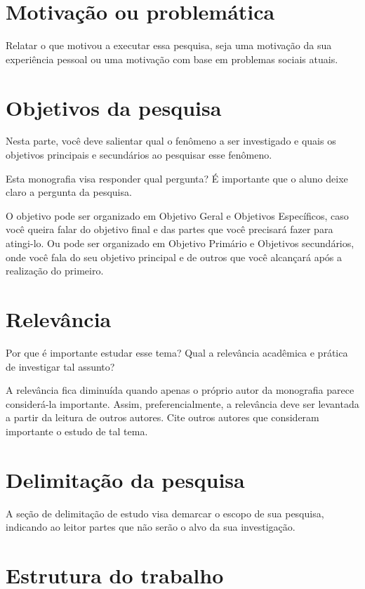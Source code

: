 \section{Motivação ou problemática}

Relatar o que motivou a executar essa pesquisa, seja uma motivação da sua experiência pessoal ou uma motivação com base em problemas sociais atuais.

\section{Objetivos da pesquisa}

Nesta parte, você deve salientar qual o fenômeno a ser investigado e quais os objetivos principais e secundários ao pesquisar esse fenômeno.

Esta monografia visa responder qual pergunta? É importante que o aluno deixe claro a pergunta da pesquisa.

O objetivo pode ser organizado em Objetivo Geral e Objetivos Específicos, caso você queira falar do objetivo final e das partes que você precisará fazer para atingi-lo. Ou pode ser organizado em Objetivo Primário e Objetivos secundários, onde você fala do seu objetivo principal e de outros que você alcançará após a realização do primeiro.

\section{Relevância}

Por que é importante estudar esse tema? Qual a relevância acadêmica e prática de investigar tal assunto? 

A relevância fica diminuída quando apenas o próprio autor da monografia parece considerá-la importante. Assim, preferencialmente, a relevância deve ser levantada a partir da leitura de outros autores. Cite outros autores que consideram importante o estudo de tal tema.

\section{Delimitação da pesquisa}

A seção de delimitação de estudo visa demarcar o escopo de sua pesquisa, indicando ao leitor partes que não serão o alvo da sua investigação.

\section{Estrutura do trabalho}

